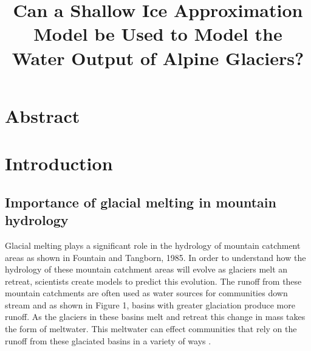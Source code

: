 \documentclass{article}
\title{Can a Shallow Ice Approximation Model be Used to Model the Water Output of Alpine Glaciers?}
\author{}
\date{}
\begin{document}
\maketitle

\section*{Abstract}

\section{Introduction}
\subsection{Importance of glacial melting in mountain hydrology}
Glacial melting plays a significant role in the hydrology of mountain catchment areas as shown in Fountain and Tangborn, 1985. In order to 
understand how the hydrology of these mountain catchment areas will evolve as glaciers melt an retreat, scientists create models to predict 
this evolution. The runoff from these mountain catchments are often used as water sources for communities down stream \cite{ref1} and as shown in 
Figure 1, basins with greater glaciation produce more runoff. As the glaciers in these basins melt and retreat this change in mass takes the 
form of meltwater. This meltwater can effect communities that rely on the runoff from these glaciated basins in a variety of ways \cite{ref2}.
\end{document}
